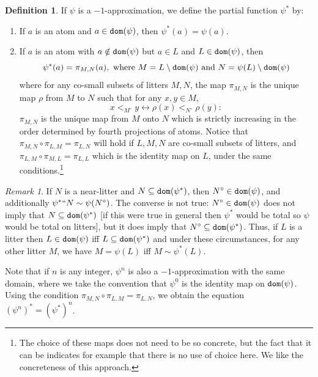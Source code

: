 \documentclass{article}
\newif\ifshowannotations
\newcommand{\annot}[1]{\ifshowannotations\marginpar{#1}\fi}
\theoremstyle{definition}
\newtheorem{definition}[theorem]{Definition}
\theoremstyle{remark}
\newtheorem{remark}[theorem]{Remark}
\begin{document}
{\begin{definition}\label{def:approx_star}
  If $\psi$ is a $-1$-approximation, we define the partial function $\psi^*$ by:
  \begin{enumerate}
    \item If $a$ is an atom and $a \in {\tt dom}(\psi)$, then $\psi^*(a) = \psi(a)$.\annot{\small LRH: The referee wants ${\tt im}(\psi)$ instead of ${\tt dom}(\psi)$ in one of these locations, but they are the same set}
    \item If $a$ is an atom with $a \notin {\tt dom}(\psi)$ but $a \in L$ and $L \in {\tt dom}(\psi)$, then
    $$ \psi^*(a) = \pi_{M, N}(a),\ \mathrm{where}\ M = L \setminus {\tt dom}(\psi) \ \mathrm{and}\ N = \psi(L) \setminus {\tt dom}(\psi) $$
    where for any co-small subsets of litters $M, N$, the map $\pi_{M,N}$ is the unique map $\rho$ from $M$ to $N$ such that for any $x, y \in M$,
    $$x <_{M^{\circ}} y \leftrightarrow \rho(x) <_{N^\circ} \rho(y):$$
    $\pi_{M,N}$ is the unique map from $M$ onto $N$ which is strictly increasing in the order determined by fourth projections of atoms.  Notice that $ \pi_{M,N} \circ \pi_{L,M} = \pi_{L,N}$ will hold if $L,M,N$ are co-small subsets of litters,
and $\pi_{L,M} \circ \pi_{M,L} = \pi_{L,L}$ which is the identity map on $L$, under the same conditions.\footnote{The choice of these maps does not need to be so concrete, but the fact that it can be indicates for example that there is no use of choice here.  We like the concreteness of this approach.}
  \end{enumerate}
\end{definition}
\begin{remark}\label{rk:approx_near_litter}
  If $N$ is a near-litter and $N \subseteq {\tt dom}(\psi^*)$, then $N^\circ \in {\tt dom}(\psi)$, and additionally $\psi^* `` N \sim \psi(N^\circ)$.
  The converse is not true: $N^\circ \in {\tt dom}(\psi)$ does not imply that $N \subseteq {\tt dom}(\psi^*)$ [if this were true in general then $\psi^*$ would be total so $\psi$ would be total on litters], but it does imply that $N^\circ \subseteq {\tt dom}(\psi^*)$.  Thus, if $L$ is a litter then $L \in {\tt dom}(\psi)$ iff $L \subseteq {\tt dom}(\psi^*)$ and under these circumstances, for any other litter $M$, we have $M = \psi(L)$ iff $M \sim \psi^*(L)$.

  Note that if $n$ is any integer, $\psi^n$ is also a $-1$-approximation with the same domain, where we take the convention that $\psi^0$ is the identity map on ${\tt dom}(\psi)$.
  Using the condition $\pi_{M,N} \circ \pi_{L,M} = \pi_{L,N}$, we obtain the equation $(\psi^n)^* = (\psi^*)^n$.
\end{remark}

}
\end{document}

